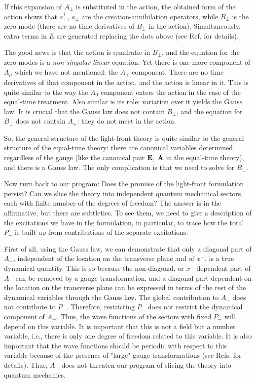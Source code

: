 \documentclass[a4paper,12pt]{article}
\begin{document}
If this expansion of $A_\perp$ is substituted in the action, 
the obtained form of the 
action shows that $a^\dagger_\perp$, $a_\perp$ 
are the creation-annihilation 
operators, while $B_\perp$ is the zero mode (there 
are no time derivatives of 
$B_\perp$ in the action). Simultaneously, extra terms 
in $E$ are generated replacing 
the dots above (see Ref. \cite{KMPV} for details).

The good news is that the action is quadratic in $B_\perp$, 
and the equation for the zero modes is a 
{\it non-singular linear} equation. 
Yet there is one more component of $A_\mu$ which we have not 
mentioned: the $A_+$ component. There are no time derivatives 
of that component in the action, 
and the action is linear in it. This is quite similar 
to the way the $A_0$ component 
enters the action in the case of the equal-time treatment. 
Also similar is its role: 
variation over it yields the Gauss law. 
It is crucial that the Gauss law does not 
contain $B_\perp$, and the equation for $B_\perp$ 
does not contain $A_+$: they 
do not meet in the action. 

So, the general structure of the light-front theory 
is quite similar to the general 
structure of the equal-time theory: there are canonical variables determined 
regardless of the gauge (like the canonical pair 
$\bf E$, $\bf A$ in the equal-time
theory), and there is a Gauss law. The only complication 
is that we need to solve for $B_\perp$. 

Now turn back to our program: Does the promise of 
the light-front formulation persist? 
Can we slice the theory into independent quantum mechanical sectors, 
each with 
finite number of the degrees of freedom? The answer 
is in the affirmative, but there are subtleties. 
To see them, we need to give a description of the 
excitations we have in the formulation, in particular, 
to trace how the total $P_-$ 
is built up from contributions of the separate excitations.

First of all, using the Gauss law, we can demonstrate that 
only a diagonal part of $A_-$, independent of the location 
on the transverse plane and of $x^-$, is a true 
dynamical quantity. This is so because the 
non-diagonal, or $x^-$-dependent part of $A_-$ 
can be removed by a gauge 
transformation, and a diagonal part 
dependent on the location on the transverse plane can 
be expressed in terms of the 
rest of the dynamical variables through the Gauss law. 
The global contribution to $A_-$ does not contribute to $P_-$. 
Therefore, restricting $P_-$ does not restrict the dynamical 
component of $A_-$. Thus, the wave functions of the 
sectors with fixed $P_-$ will depend on this variable. 
It is important that this is 
not a field but a number variable, i.e., there is only 
one degree of freedom related 
to this variable. 
It is also important that the wave functions 
should be periodic with 
respect to this variable because of the presence of "large" 
gauge transformations 
(see Refs. \cite{KMPV,Martinovic} for details). Thus, $A_-$ does 
not threaten our 
program of slicing the theory into quantum mechanics.
\end{document}
